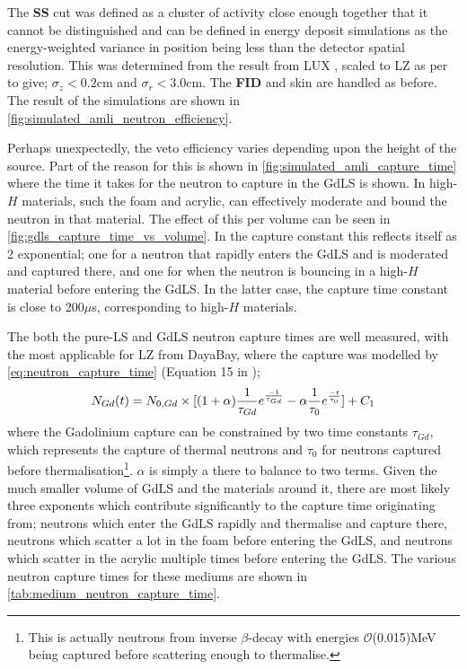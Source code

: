 \par
The \textbf{SS} cut was defined as a cluster of activity close enough together that it cannot be distinguished and can be defined in energy deposit simulations as the energy-weighted variance in position being less than the detector spatial resolution.
This was determined from the result from LUX \cite{lux_position_reconstruction_ref}, scaled to LZ as per \cite{LZ_TechnicalDesignReview_ref} to give; ${\sigma}_{z}<0.2$cm and ${\sigma}_{r}<3.0$cm.
The \textbf{FID} and skin are handled as before.
The result of the simulations are shown in \autoref{fig:simulated_amli_neutron_efficiency}.


\par
Perhaps unexpectedly, the veto efficiency varies depending upon the height of the source.
Part of the reason for this is shown in \autoref{fig:simulated_amli_capture_time} where the time it takes for the neutron to capture in the GdLS is shown.
In high-$H$ materials, such the foam and acrylic, can effectively moderate and bound the neutron in that material.
The effect of this per volume can be seen in \autoref{fig:gdls_capture_time_vs_volume}.
In the capture constant this reflects itself as 2 exponential; one for a neutron that rapidly enters the GdLS and is moderated and captured there, and one for when the neutron is bouncing in a high-$H$ material before entering the GdLS.
In the latter case, the capture time constant is close to 200$\mu$s, corresponding to high-$H$ materials.
\par
The both the pure-LS and GdLS neutron capture times are well measured, with the most applicable for LZ from DayaBay, where the capture was modelled by \autoref{eq:neutron_capture_time} (Equation 15 in \cite{Dayabay_neutron_capture_fit_ref});
\begin{equation}
    N_{Gd}(t) = N_{0,Gd} \times [(1+\alpha)\frac{1}{\tau_{Gd}}e^{\frac{-1}{\tau_{Gd}}} - \alpha\frac{1}{\tau_{0}}e^{\frac{-t}{\tau_{0}}}] + C_{1} \\
\label{eq:neutron_capture_time}
\end{equation}
where the Gadolinium capture can be constrained by two time constants $\tau_{Gd}$, which represents the capture of thermal neutrons and $\tau_{0}$ for neutrons captured before thermalisation\footnote{This is actually neutrons from inverse $\beta$-decay with energies $\mathcal{O}$(0.015)MeV being captured before scattering enough to thermalise.}. 
$\alpha$ is simply a there to balance to two terms.
Given the much smaller volume of GdLS and the materials around it, there are most likely three exponents which contribute significantly to the capture time originating from; neutrons which enter the GdLS rapidly and thermalise and capture there, neutrons which scatter a lot in the foam before entering the GdLS, and neutrons which scatter in the acrylic multiple times before entering the GdLS.
The various neutron capture times for these mediums are shown in \autoref{tab:medium_neutron_capture_time}.

